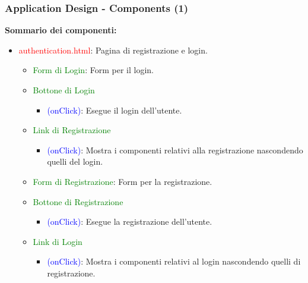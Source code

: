 \documentclass[aspectratio=169, dvipsnames]{beamer}
\begin{document}
\begin{frame}
    \frametitle{Application Design - Components (1)}
    \textbf{Sommario dei componenti:}
    \begin{itemize}
        \item \textcolor{Red}{authentication.html}: Pagina di registrazione e login.
              \begin{itemize}
                  \item \textcolor{Green}{Form di Login}: Form per il login.
                  \item \textcolor{Green}{Bottone di Login}
                        \begin{itemize}
                            \item \textcolor{Blue}{(onClick)}: Esegue il login dell'utente.
                        \end{itemize}
                  \item \textcolor{Green}{Link di Registrazione}
                        \begin{itemize}
                            \item \textcolor{Blue}{(onClick)}: Mostra i componenti relativi alla registrazione
                                  nascondendo quelli del login.
                        \end{itemize}

                  \item \textcolor{Green}{Form di Registrazione}: Form per la registrazione.
                  \item \textcolor{Green}{Bottone di Registrazione}
                        \begin{itemize}
                            \item \textcolor{Blue}{(onClick)}: Esegue la registrazione dell'utente.
                        \end{itemize}
                  \item \textcolor{Green}{Link di Login}
                        \begin{itemize}
                            \item \textcolor{Blue}{(onClick)}: Mostra i componenti relativi al login
                                  nascondendo quelli di registrazione.
                        \end{itemize}
              \end{itemize}
    \end{itemize}
\end{frame}
\end{document}
